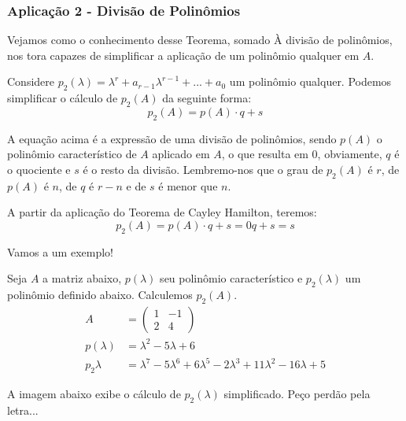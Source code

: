 \documentclass[12pt]{article}
\begin{document}
	\subsubsection{Aplicação 2 - Divisão de Polinômios}
	
	Vejamos como o conhecimento desse Teorema, somado À divisão de polinômios, nos tora capazes de simplificar a aplicação de um polinômio qualquer em $A$.
	
	Considere $p_2(\lambda)=\lambda^r+a_{r-1}\lambda^{r-1}+...+a_0$ um polinômio qualquer. Podemos simplificar o cálculo de $p_2(A)$ da seguinte forma:
	\begin{equation*}
		p_2(A)=p(A)\cdot q+ s
	\end{equation*}
	
	A equação acima é a expressão de uma divisão de polinômios, sendo $p(A)$ o polinômio característico de $A$ aplicado em $A$, o que resulta em 0, obviamente, $q$ é o quociente e $s$ é o resto da divisão. Lembremo-nos que o grau de $p_2(A)$ é $r$, de $p(A)$ é $n$, de $q$ é $r-n$ e de $s$ é menor que $n$.
	
	A partir da aplicação do Teorema de Cayley Hamilton, teremos:
	\begin{equation*}
		p_2(A)=p(A)\cdot q+ s=0q+s=s
	\end{equation*}
	
	
	Vamos a um exemplo!
	
	Seja $A$ a matriz abaixo, $p(\lambda)$ seu polinômio característico e $p_2(\lambda)$ um polinômio definido abaixo. Calculemos $p_2(A)$.
	\begin{align*}
		A&=\begin{pmatrix}
			1&-1\\
			2&4
		\end{pmatrix}\\
		p(\lambda)&=\lambda^2-5\lambda+6\\
		p_2{\lambda}&=\lambda^7-5\lambda^6+6\lambda^5-2\lambda^3+11\lambda^2-16\lambda+5
	\end{align*}
	
	A imagem abaixo exibe o cálculo de $p_2(\lambda)$ simplificado. Peço perdão pela letra...
	
\end{document}
